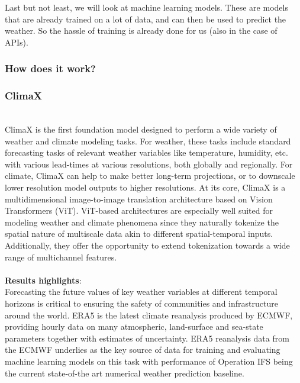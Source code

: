 \documentclass[../paper.tex]{subfiles}
\begin{document}
    Last but not least, we will look at machine learning models.
    These are models that are already trained on a lot of data, and can then be used to predict the weather.
    So the hassle of training is already done for us (also in the case of APIs).

    \subsubsection{How does it work?}

    \subsubsection{ClimaX}
        \hfill\\
        ClimaX is the first foundation model designed to perform a wide variety of weather and climate modeling tasks.
        For weather, these tasks include standard forecasting tasks of relevant weather variables like temperature,
        humidity, etc.
        with various lead-times at various resolutions, both globally and regionally.
        For climate, ClimaX can help to make better long-term projections,
        or to downscale lower resolution model outputs to higher resolutions.
        At its core, ClimaX is a multidimensional image-to-image translation architecture based on Vision Transformers
        (ViT).
        ViT-based architectures are especially well suited for modeling weather and climate phenomena
        since they naturally tokenize the spatial nature of multiscale data akin to different spatial-temporal inputs.
        Additionally,
        they offer the opportunity to extend tokenization towards a wide range of multichannel features\cite{d1}.
        \\\\
        \textbf{Results highlights}:\\
            Forecasting the future values of key weather variables at different temporal horizons is critical
            to ensuring the safety of communities and infrastructure around the world.
            ERA5 is the latest climate reanalysis produced by ECMWF,
            providing hourly data on many atmospheric,
            land-surface and sea-state parameters together with estimates of uncertainty\cite{d2}.
            ERA5 reanalysis data from the ECMWF underlies as the key source of data for training
            and evaluating machine learning models on this task with performance of Operation
            IFS being the current state-of-the art numerical weather prediction baseline.
\end{document}
